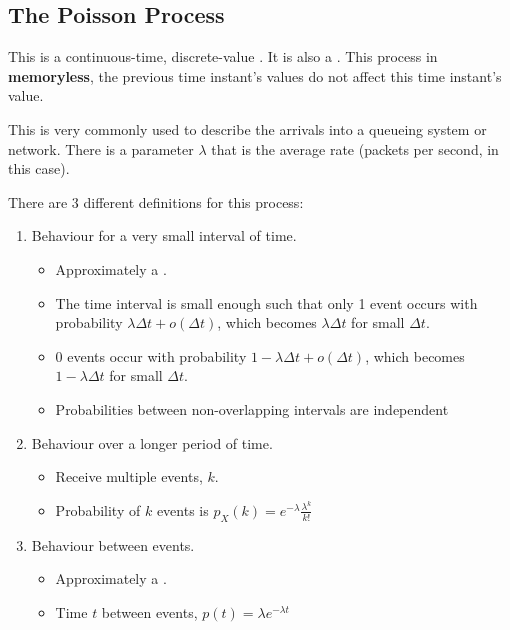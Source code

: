 \subsection{The Poisson Process}\label{subsec:Poisson_Process}
\begin{definition}\label{def:Poisson_Process}
  This is a continuous-time, discrete-value .
  It is also a .
  This process in \textbf{memoryless}, the previous time instant's values do not affect this time instant's value.

  This is very commonly used to describe the arrivals into a queueing system or network.
  There is a parameter $\lambda$ that is the average rate (packets per second, in this case).

  There are 3 different definitions for this process:
  \begin{enumerate}[noitemsep]
  \item Behaviour for a very small interval of time.
    \begin{itemize}[noitemsep]
    \item Approximately a .
    \item The time interval is small enough such that only 1 event occurs with probability $\lambda \Delta t + o(\Delta t)$, which becomes $\lambda \Delta t$ for small $\Delta t$.
    \item 0 events occur with probability $1 -\lambda \Delta t + o(\Delta t)$, which becomes $1 - \lambda \Delta t$ for small $\Delta t$.
    \item Probabilities between non-overlapping intervals are independent
    \end{itemize}

  \item Behaviour over a longer period of time.
    \begin{itemize}[noitemsep]
    \item Receive multiple events, $k$.
    \item Probability of $k$ events is $p_{X}(k) = e^{-\lambda} \frac{\lambda^{k}}{k!}$
    \end{itemize}

  \item Behaviour between events.
    \begin{itemize}[noitemsep]
    \item Approximately a .
    \item Time $t$ between events, $p(t) = \lambda e^{-\lambda t}$
    \end{itemize}
  \end{enumerate}
\end{definition}

